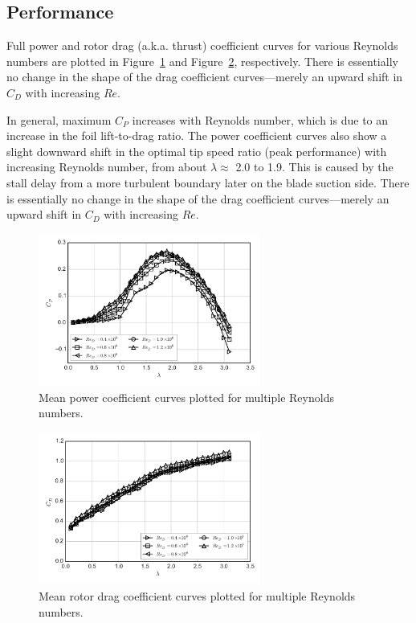 \documentclass[energies,article,accept,moreauthors,pdftex,12pt,a4paper]{mdpi}
\begin{document}
\subsection{Performance}

Full power and rotor drag (a.k.a. thrust) coefficient curves for various
Reynolds numbers are plotted in Figure~\ref{fig:cp-curves} and
Figure~\ref{fig:cd-curves}, respectively. There is essentially no change in the
shape of the drag coefficient curves---merely an upward shift in $C_D$ with
increasing $Re$.

In general, maximum $C_P$ increases with Reynolds number, which is due to an
increase in the foil lift-to-drag ratio. The power coefficient curves also show
a slight downward shift in the optimal tip speed ratio (peak performance) with
increasing Reynolds number, from about $\lambda \approx$ 2.0 to 1.9. This is
caused by the stall delay from a more turbulent boundary later on the blade
suction side. There is essentially no change in the shape of the drag
coefficient curves---merely an upward shift in $C_D$ with increasing $Re$.

\begin{figure}[ht]
\centering
\includegraphics[width=0.65\textwidth]{figures/cp_curves}
\caption{Mean power coefficient curves plotted for
multiple Reynolds numbers.}
\label{fig:cp-curves}
\end{figure}

\begin{figure}[ht]
\centering
\includegraphics[width=0.65\textwidth]{figures/cd_curves}
\caption{Mean rotor drag coefficient curves plotted for
multiple Reynolds numbers.}
\label{fig:cd-curves}
\end{figure}
\end{document}
